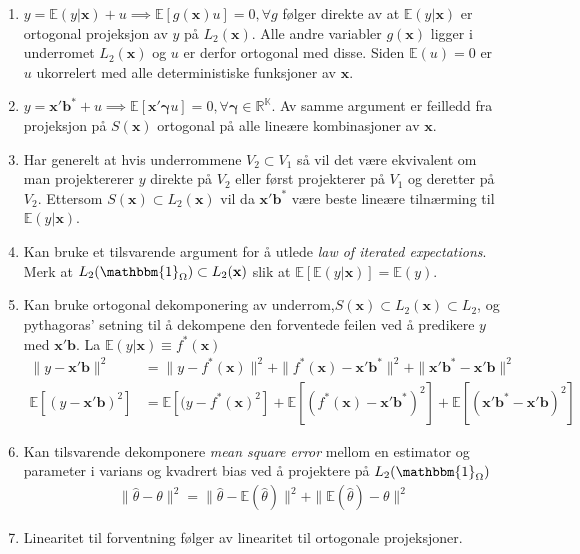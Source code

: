 \begin{enumerate}
  \item $y = \mathbb{E}(y|\mathbf{x}) + u \implies \mathbb{E}[g(\mathbf{x})u] = 0, \forall g$ følger direkte av at $\mathbb{E}(y|\mathbf{x})$ er ortogonal projeksjon av $y$ på $L_2(\mathbf{x})$. Alle andre variabler $g(\mathbf{x})$ ligger i underromet $L_2(\mathbf{x})$ og $u$ er derfor ortogonal med disse. Siden $\mathbb{E}(u) = 0$ er $u$ ukorrelert med alle deterministiske funksjoner av $\mathbf{x}$. 
  \item $y = \mathbf{x}'\mathbf{b}^* + u \implies \mathbb{E}[\mathbf{x}'\mathbf{\gamma}u] = 0, \forall \mathbf{\gamma} \in \mathbb{R^K}$. Av samme argument er feilledd fra projeksjon på $S(\mathbf{x})$ ortogonal på alle lineære kombinasjoner av $\mathbf{x}$. 
\item Har generelt at hvis underrommene $V_2 \subset V_1$ så vil det være ekvivalent om man projektererer $y$ direkte på $V_2$ eller først projekterer på $V_1$ og deretter på $V_2$. Ettersom $S(\mathbf{x}) \subset L_2(\mathbf{x})$ vil da $\mathbf{x}'\mathbf{b}^*$ være beste lineære tilnærming til $\mathbb{E}(y|\mathbf{x})$.
\item Kan bruke et tilsvarende argument for å utlede \textit{law of iterated expectations}. Merk at $L_2(\mathbbm{1}_\Omega) \subset L_2(\mathbf{x})$ slik at $\mathbb{E}[\mathbb{E}(y|\mathbf{x})] = \mathbb{E}(y)$.
\item Kan bruke ortogonal dekomponering av underrom,$S(\mathbf{x}) \subset L_2(\mathbf{x}) \subset L_2$, og pythagoras' setning til å dekompene den forventede feilen ved å predikere $y$ med $\mathbf{x}'\mathbf{b}$. La $\mathbb{E}(y|\mathbf{x}) \equiv f^*(\mathbf{x})$
\begin{align}
\| y- \mathbf{x}'\mathbf{b} \|^2 &= \| y-  f^*(\mathbf{x})\|^2 + \| f^*(\mathbf{x}) - \mathbf{x}'\mathbf{b}^*\|^2 + \| \mathbf{x}'\mathbf{b}^* - \mathbf{x}'\mathbf{b} \|^2 \\
\mathbb{E}[(y- \mathbf{x}'\mathbf{b})^2]&=\mathbb{E}[(y-  f^*(\mathbf{x})^2] + \mathbb{E}[(f^*(\mathbf{x}) - \mathbf{x}'\mathbf{b}^*)^2] + \mathbb{E}[(\mathbf{x}'\mathbf{b}^* - \mathbf{x}'\mathbf{b})^2]
\end{align}
\item Kan tilsvarende dekomponere \textit{mean square error} mellom en estimator og parameter i varians og kvadrert bias ved å projektere på  $L_2(\mathbbm{1}_\Omega)$
\begin{align}
\| \hat{\theta} - \theta \|^2 = \| \hat{\theta} - \mathbb{E}(\hat{\theta}) \|^2 + \| \mathbb{E}(\hat{\theta})-\theta \|^2
\end{align}
\item Linearitet til forventning følger av linearitet til ortogonale projeksjoner.
\end{enumerate}
